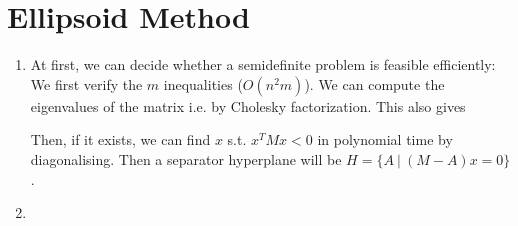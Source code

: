 \documentclass{scrartcl}
\newcommand\1{\mathbf{1}}
\begin{document}
\section{Ellipsoid Method}
\begin{enumerate}
\item
At first, we can decide whether a semidefinite problem is feasible efficiently: We first verify the $m$ inequalities ($O(n^2m)$). We can compute the eigenvalues of the matrix i.e. by Cholesky factorization. This also gives 

Then, if it exists, we can find $x$ s.t. $x^T M x < 0$ in polynomial time by diagonalising. Then a separator hyperplane will be $H = \{A\ |\ (M-A) x = 0\}$. 

\item


\end{enumerate}
\end{document}
